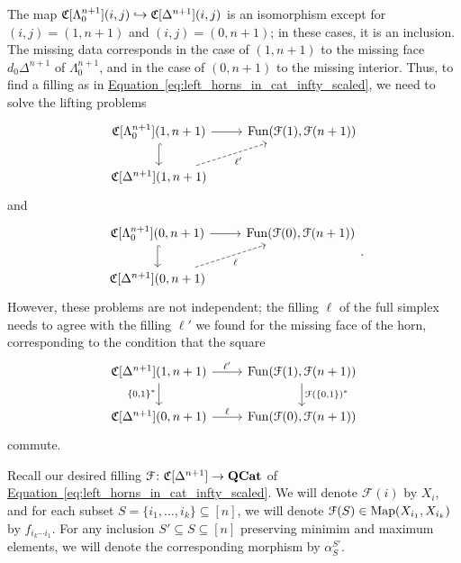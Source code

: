 \documentclass[main.tex]{subfiles}
\begin{document}
The map $\mathfrak{C}[\Lambda^{n+1}_{0}](i, j) \hookrightarrow \mathfrak{C}[\Delta^{n+1}](i, j)$ is an isomorphism except for $(i, j) = (1, n+1)$ and $(i, j) = (0, n+1)$; in these cases, it is an inclusion. The missing data corresponds in the case of $(1, n+1)$ to the missing face $d_{0}\Delta^{n+1}$ of $\Lambda^{n+1}_{0}$, and in the case of $(0, n+1)$ to the missing interior. Thus, to find a filling as in \hyperref[eq:left_horns_in_cat_infty_scaled]{Equation~\ref*{eq:left_horns_in_cat_infty_scaled}}, we need to solve the lifting problems
\begin{equation}
  \label{eq:lifting_problem_1}
  \begin{tikzcd}
    \C[\Lambda^{n+1}_{0}](1, n+1)
    \arrow[r]
    \arrow[d, hook]
    & \Fun(\mathcal{F}(1), \mathcal{F}(n+1))
    \\
    \C[\Delta^{n+1}](1, n+1)
    \arrow[ur, dashed, swap, "\ell'"]
  \end{tikzcd}
\end{equation}
and
\begin{equation}
  \label{eq:lifting_problem_2}
  \begin{tikzcd}
    \C[\Lambda^{n+1}_{0}](0, n+1)
    \arrow[r]
    \arrow[d, hook]
    & \Fun(\mathcal{F}(0), \mathcal{F}(n+1))
    \\
    \C[\Delta^{n+1}](0, n+1)
    \arrow[ur, dashed, swap, "\ell"]
  \end{tikzcd}.
\end{equation}
However, these problems are not independent; the filling $\ell$ of the full simplex needs to agree with the filling $\ell'$ we found for the missing face of the horn, corresponding to the condition that the square
\begin{equation}
  \label{eq:lifting_problem_compatibility_condition}
  \begin{tikzcd}
    \C[\Delta^{n+1}](1, n+1)
    \arrow[r, "\ell'"]
    \arrow[d, swap, "{\{0,1\}}^{*}"]
    & \Fun(\mathcal{F}(1), \mathcal{F}(n+1))
    \arrow[d, "\mathcal{F}({\{0, 1\}})^{*}"]
    \\
    \C[\Delta^{n+1}](0, n+1)
    \arrow[r, "\ell"]
    & \Fun(\mathcal{F}(0), \mathcal{F}(n+1))
  \end{tikzcd}
\end{equation}
commute.

\begin{notation}
  \label{notation:simplicial_lifting}
  Recall our desired filling $\mathcal{F}\colon \mathfrak{C}[\Delta^{n+1}] \to \mathbf{QCat}$ of \hyperref[eq:left_horns_in_cat_infty_scaled]{Equation~\ref*{eq:left_horns_in_cat_infty_scaled}}. We will denote $\mathcal{F}(i)$ by $X_{i}$, and for each subset $S = \{i_{1}, \ldots, i_{k}\} \subseteq [n]$, we will denote $\mathcal{F}(S) \in \mathrm{Map}(X_{i_{1}}, X_{i_{k}})$ by $f_{i_{k}\cdots i_{1}}$. For any inclusion $S' \subseteq S \subseteq [n]$ preserving minimim and maximum elements, we will denote the corresponding morphism by $\alpha^{S'}_{S}$.
\end{notation}
\end{document}
